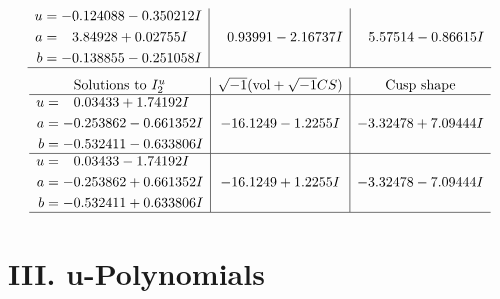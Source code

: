 \documentclass[1p]{elsarticle_modified}
\theoremstyle{definition}
\newcommand{\I}{\sqrt{-1}}
\begin{document}
$$\begin{array}{c|c|c}
\begin{aligned}
u &= -0.124088 - 0.350212 I \\
a &= \phantom{-}3.84928 + 0.02755 I \\
b &= -0.138855 - 0.251058 I\end{aligned}
 & \phantom{-}0.93991 - 2.16737 I & \phantom{-}5.57514 - 0.86615 I\\
 \hline 
 \end{array}$$\newpage$$\begin{array}{c|c|c}  
\text{Solutions to }I^u_{2}& \I (\text{vol} + \sqrt{-1}CS) & \text{Cusp shape}\\
 \hline 
\begin{aligned}
u &= \phantom{-}0.03433 + 1.74192 I \\
a &= -0.253862 - 0.661352 I \\
b &= -0.532411 - 0.633806 I\end{aligned}
 & -16.1249 - 1.2255 I & -3.32478 + 7.09444 I \\ \hline\begin{aligned}
u &= \phantom{-}0.03433 - 1.74192 I \\
a &= -0.253862 + 0.661352 I \\
b &= -0.532411 + 0.633806 I\end{aligned}
 & -16.1249 + 1.2255 I & -3.32478 - 7.09444 I\\
 \hline 
 \end{array}$$\newpage
\newpage\renewcommand{\arraystretch}{1}
\centering \section*{ III. u-Polynomials}
\end{document}
